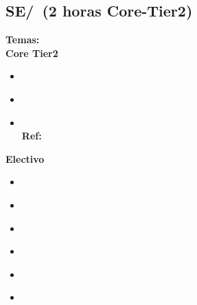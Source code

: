 \subsection{SE/\SESoftwareProjectManagement~(2 horas Core-Tier2)}\label{sec:BOK:SESoftwareProjectManagement}
\noindent \textbf{Temas:}\\
\noindent \textbf{Core Tier2}
\begin{itemize}
	\item \SESoftwareProjectManagementTopicTeam\label{sec:BOK:SESoftwareProjectManagementTopicTeam}
	\item \SESoftwareProjectManagementTopicEffort\label{sec:BOK:SESoftwareProjectManagementTopicEffort}
	\item \SESoftwareProjectManagementTopicRisk\xspace \\ \textbf{Ref:} \label{sec:BOK:SESoftwareProjectManagementTopicRisk}
\end{itemize}

\noindent \textbf{Electivo}
\begin{itemize}
	\item \SESoftwareProjectManagementTopicTeamManagement\label{sec:BOK:SESoftwareProjectManagementTopicTeamManagement}
	\item \SESoftwareProjectManagementTopicProject\label{sec:BOK:SESoftwareProjectManagementTopicProject}
	\item \SESoftwareProjectManagementTopicSoftwareMeasurement\label{sec:BOK:SESoftwareProjectManagementTopicSoftwareMeasurement}
	\item \SESoftwareProjectManagementTopicSoftwareQuality\label{sec:BOK:SESoftwareProjectManagementTopicSoftwareQuality}
	\item \SESoftwareProjectManagementTopicRiskS\label{sec:BOK:SESoftwareProjectManagementTopicRiskS}
	\item \SESoftwareProjectManagementTopicSystem\label{sec:BOK:SESoftwareProjectManagementTopicSystem}
\end{itemize}


